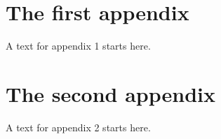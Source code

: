 \documentclass{report}
\begin{document}
\appendix
{}
\chapter{The first  appendix}
A text for appendix 1 starts here.
\chapter{The second appendix}
A text for appendix 2 starts here.

\printindex
\end{document}
